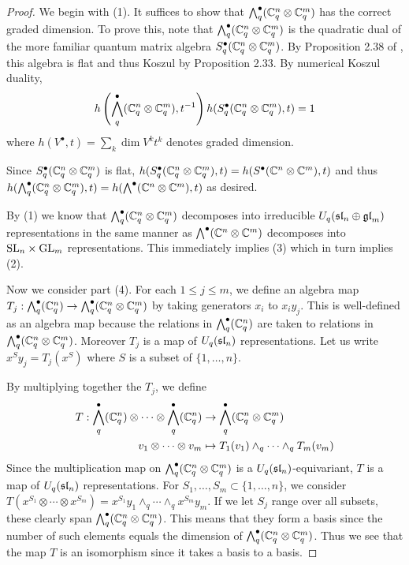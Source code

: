 \documentclass[10pt,leqno]{article}
\begin{document}
\begin{proof}
We begin with (1). It suffices to show that $ \Alt^\bullet_q(\bC_q^n \otimes \bC_q^m) $   has the correct graded dimension.  To prove this, note that $\Alt^\bullet_q(\bC_q^n \otimes \bC_q^m) $ is the quadratic dual of the more familiar quantum matrix algebra $ S_q^\bullet (\bC_q^n \otimes \bC_q^m) $.  By Proposition 2.38 of \cite{BZ}, this algebra is flat and thus Koszul by Proposition 2.33.  By numerical Koszul duality,
$$ h\left(\Alt^\bullet_q( \bC_q^n \otimes \bC_q^m), t^{-1}\right) h(S^\bullet_q (\bC_q^n \otimes \bC_q^m), t) = 1 $$ 
where $ h(V^\bullet, t) = \sum_k \dim V^k t^k $ denotes graded dimension.
    
Since $ S^\bullet_q (\bC_q^n \otimes \bC_q^m) $ is flat, $ h(S^\bullet_q (\bC_q^n \otimes \bC_q^m), t) =  h(S^\bullet (\bC^n \otimes \bC^m), t) $ and thus  $ h(\Alt^\bullet_q (\bC_q^n \otimes \bC_q^m), t) =  h(\Alt^\bullet (\bC^n \otimes \bC^m), t)$ as desired.
    
By (1) we know that $ \Alt^\bullet_q(\bC_q^n \otimes \bC_q^m) $ decomposes into irreducible $ U_q(\sl_n \oplus \gl_m) $ representations in the same manner as $ \Alt^\bullet(\bC^n \otimes \bC^m) $ decomposes into $ \SL_n \times \GL_m $ representations.  This immediately implies (3) which in turn implies (2).

Now we consider part (4).  For each $ 1 \le j \le m$, we define an algebra map $T_j : \Alt^\bullet_q(\bC_q^n) \rightarrow \Alt^\bullet_q (\bC_q^n \otimes \bC_q^m) $ by taking generators $ x_i $ to $ x_i y_j$.  This is well-defined as an algebra map because the relations in $ \Alt^\bullet_q(\bC_q^n) $ are taken to relations in $\Alt^\bullet_q (\bC_q^n \otimes \bC_q^m)$.  Moreover $T_j $ is a map of $ U_q(\sl_n) $ representations.   Let us write $ x^S y_j = T_j(x^S) $ where $ S $ is a subset of $ \{ 1, \dots, n \} $.

By multiplying together the $ T_j $, we define
\begin{align*}
T : \Alt^\bullet_q(\bC_q^n) \otimes \cdots \otimes \Alt^\bullet_q(\bC_q^n) &\rightarrow \Alt_q^\bullet (\bC_q^n \otimes \bC_q^m) \\
v_1 \otimes \cdots \otimes v_m &\mapsto T_1(v_1) \wedge_q \cdots \wedge_q T_m(v_m)
\end{align*}
Since the multiplication map on $\Alt_q^\bullet (\bC_q^n \otimes \bC_q^m)  $ is a $U_q(\sl_n)$-equivariant, $ T $ is a map of $ U_q(\sl_n) $ representations. For $ S_1, \dots, S_m \subset \{1, \dots, n \} $, we consider $ T(x^{S_1} \otimes \cdots \otimes x^{S_m}) = x^{S_1} y_1 \wedge_q \cdots \wedge_q x^{S_m}y_m $.  If we let $ S_j $ range over all subsets, these clearly span $ \Alt_q^\bullet (\bC_q^n \otimes \bC_q^m) $.  This means that they form a basis since the number of such elements equals the dimension of $ \Alt_q^\bullet (\bC_q^n \otimes \bC_q^m) $.  Thus we see that the map $ T $ is an isomorphism since it takes a basis to a basis. 
\end{proof}
\end{document}
